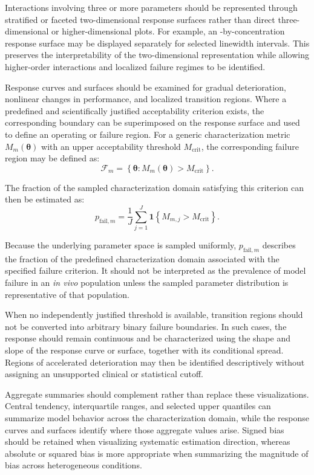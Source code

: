 Interactions involving three or more parameters should be represented through stratified or faceted two-dimensional response surfaces rather than direct three-dimensional or higher-dimensional plots. For example, an \SNR-by-concentration response surface may be displayed separately for selected linewidth intervals. This preserves the interpretability of the two-dimensional representation while allowing higher-order interactions and localized failure regimes to be identified.

Response curves and surfaces should be examined for gradual deterioration, nonlinear changes in performance, and localized transition regions. Where a predefined and scientifically justified acceptability criterion exists, the corresponding boundary can be superimposed on the response surface and used to define an operating or failure region. For a generic characterization metric $M_m(\boldsymbol{\theta})$ with an upper acceptability threshold $M_{\mathrm{crit}}$, the corresponding failure region may be defined as:
\begin{equation}
    \mathcal{F}_m = \left\{\boldsymbol{\theta}:M_m(\boldsymbol{\theta}) > M_{\mathrm{crit}}\right\}.
\end{equation}

The fraction of the sampled characterization domain satisfying this criterion can then be estimated as:
\begin{equation}
    p_{\mathrm{fail},m} = \frac{1}{J}\sum_{j=1}^{J}\mathbf{1}\left\{M_{m,j} > M_{\mathrm{crit}}\right\}.
\end{equation}

Because the underlying parameter space is sampled uniformly, $p_{\mathrm{fail},m}$ describes the fraction of the predefined characterization domain associated with the specified failure criterion. It should not be interpreted as the prevalence of model failure in an \textit{in vivo} population unless the sampled parameter distribution is representative of that population.

When no independently justified threshold is available, transition regions should not be converted into arbitrary binary failure boundaries. In such cases, the response should remain continuous and be characterized using the shape and slope of the response curve or surface, together with its conditional spread. Regions of accelerated deterioration may then be identified descriptively without assigning an unsupported clinical or statistical cutoff.

Aggregate summaries should complement rather than replace these visualizations. Central tendency, interquartile ranges, and selected upper quantiles can summarize model behavior across the characterization domain, while the response curves and surfaces identify where those aggregate values arise. Signed bias should be retained when visualizing systematic estimation direction, whereas absolute or squared bias is more appropriate when summarizing the magnitude of bias across heterogeneous conditions.

